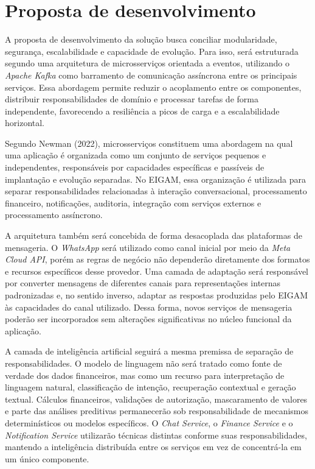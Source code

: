 \chapter{Proposta de desenvolvimento}

A proposta de desenvolvimento da solução busca conciliar modularidade, segurança, escalabilidade e capacidade de evolução. Para isso, será estruturada segundo uma arquitetura de microsserviços orientada a eventos, utilizando o \textit{Apache Kafka} como barramento de comunicação assíncrona entre os principais serviços. Essa abordagem permite reduzir o acoplamento entre os componentes, distribuir responsabilidades de domínio e processar tarefas de forma independente, favorecendo a resiliência a picos de carga e a escalabilidade horizontal.

Segundo Newman (2022), microsserviços constituem uma abordagem na qual uma aplicação é organizada como um conjunto de serviços pequenos e independentes, responsáveis por capacidades específicas e passíveis de implantação e evolução separadas. No EIGAM, essa organização é utilizada para separar responsabilidades relacionadas à interação conversacional, processamento financeiro, notificações, auditoria, integração com serviços externos e processamento assíncrono.

A arquitetura também será concebida de forma desacoplada das plataformas de mensageria. O \textit{WhatsApp} será utilizado como canal inicial por meio da \textit{Meta Cloud API}, porém as regras de negócio não dependerão diretamente dos formatos e recursos específicos desse provedor. Uma camada de adaptação será responsável por converter mensagens de diferentes canais para representações internas padronizadas e, no sentido inverso, adaptar as respostas produzidas pelo EIGAM às capacidades do canal utilizado. Dessa forma, novos serviços de mensageria poderão ser incorporados sem alterações significativas no núcleo funcional da aplicação.

A camada de inteligência artificial seguirá a mesma premissa de separação de responsabilidades. O modelo de linguagem não será tratado como fonte de verdade dos dados financeiros, mas como um recurso para interpretação de linguagem natural, classificação de intenção, recuperação contextual e geração textual. Cálculos financeiros, validações de autorização, mascaramento de valores e parte das análises preditivas permanecerão sob responsabilidade de mecanismos determinísticos ou modelos específicos. O \textit{Chat Service}, o \textit{Finance Service} e o \textit{Notification Service} utilizarão técnicas distintas conforme suas responsabilidades, mantendo a inteligência distribuída entre os serviços em vez de concentrá-la em um único componente.

